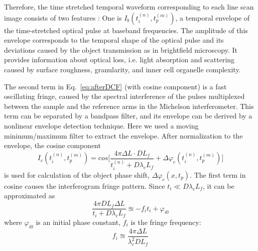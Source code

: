 \documentclass[aps,pra,reprint,superscriptaddress]{revtex4-1}
\begin{document}
Therefore, the time stretched temporal waveform corresponding to each line scan image consists of two features \cite{mahjoubfar2014label}: One is $I_b (t_i^{(n)}, t_p^{(m)})$, a temporal envelope of the time-stretched optical pulse at baseband frequencies. The amplitude of this envelope corresponds to the temporal shape of the optical pulse and its deviations caused by the object transmission as in brightfield microscopy. It provides information about optical loss, i.e. light absorption and scattering caused by surface roughness, granularity, and inner cell organelle complexity. 

The second term in Eq.~\ref{eq:afterDCF} (with cosine component) is a fast oscillating fringe, caused by the spectral interference of the pulses multiplexed between the sample and the reference arms in the Michelson interferometer. This term can be separated by a bandpass filter, and its envelope can be derived by a nonlinear envelope detection technique. Here we used a moving minimum/maximum filter to extract the envelope. After normalization to the envelope, the cosine component 
\begin{equation}
I_c (t_i^{(n)}, t_p^{(m)}) = cos\Bigg[ \frac{4\pi\Delta L \cdot D L_f}{t_i^{(n)} + D\lambda_c L_f} + \Delta \varphi_c(t_i^{(n)}, t_p^{(m)}) \Bigg]
\end{equation}
is used for calculation of the object phase shift, $\Delta\varphi_c(x,t_p)$. The first term in cosine causes the interferogram fringe pattern. Since $t_i \ll D \lambda_c L_f$, it can be approximated as
\begin{equation}
\frac{4\pi D L_f \Delta L}{t_i + D \lambda_c L_f} \approxeq - f_i t_i + \varphi_{i0}
\end{equation}
where $\varphi_{i0}$ is an initial phase constant, $f_i$ is the fringe frequency:
\begin{equation}
f_i \approxeq \frac{4\pi \Delta L}{\lambda_c^2 D L_f}
\end{equation}
\end{document}
